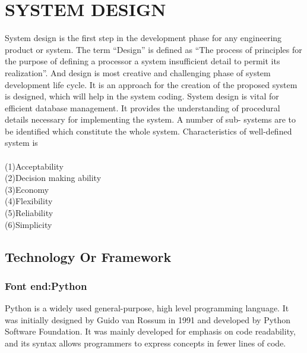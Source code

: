 \documentclass[a4paper, 12pt]{report}
\begin{document}
 \newpage
 \section{SYSTEM DESIGN}
 System design is the ﬁrst step in the development phase for any engineering product or system. The term “Design” is deﬁned as “The process of principles for the purpose of deﬁning a processor a system insuﬃcient detail to permit its realization”. And design is most creative and challenging phase of system development life cycle. It is an approach for the creation of the proposed system is designed, which will help in the system coding. System design is vital for eﬃcient database management. It provides the understanding of procedural details necessary for implementing the system. A number of sub- systems are to be identiﬁed which constitute the whole system.
Characteristics of well-deﬁned system is\\ \\(1)Acceptability\\ (2)Decision making ability\\ (3)Economy \\(4)Flexibility \\(5)Reliability\\ (6)Simplicity








\subsection{Technology Or Framework}

\subsubsection{Font end:Python}
Python is a widely used general-purpose, high level programming language. It was initially designed by Guido van Rossum in 1991 and developed by Python Software Foundation. It was mainly developed for emphasis on code readability, and its syntax allows programmers to express concepts in fewer lines of code.
\end{document}
